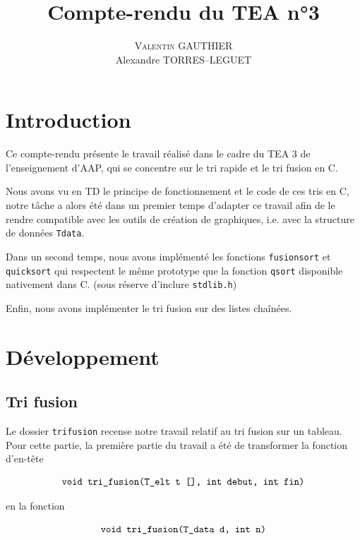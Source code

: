 \documentclass[11pt]{article}
\title{Compte-rendu du TEA n°3}
\author{\textsc{Valentin GAUTHIER}\\ Alexandre TORRES--LEGUET}
\begin{document}
\maketitle

\section{Introduction}

\quad \quad Ce compte-rendu présente le travail réalisé dans le cadre du TEA 3 de l'enseignement d'AAP, qui se concentre sur le tri rapide et le tri fusion en \textsc{C}.
 
Nous avons vu en TD le principe de fonctionnement et le code de ces tris en \textsc{C}, notre tâche a alors été dans un premier temps d'adapter ce travail afin de le rendre compatible avec les outils de création de graphiques, i.e. avec la structure de données \texttt{T\textunderscore data}. 

Dans un second temps, nous avons implémenté les fonctions \texttt{fusionsort} et \texttt{quicksort} qui respectent le même prototype que la fonction \texttt{qsort} disponible nativement dans \textsc{C}. (sous réserve d'inclure \texttt{stdlib.h})

Enfin, nous avons implémenter le tri fusion sur des listes chaînées.



\section{Développement}

\subsection{Tri fusion}

\quad \quad Le dossier \texttt{tri\textunderscore fusion} recense notre travail relatif au tri fusion sur un tableau. \\

Pour cette partie, la première partie du travail a été de transformer la fonction d'en-tête

$$
\texttt{void tri\textunderscore fusion(T\textunderscore elt t [], int debut, int fin)}
$$

en la fonction

$$
\texttt{void tri\textunderscore fusion(T\textunderscore data d, int n)}
$$
\end{document}

